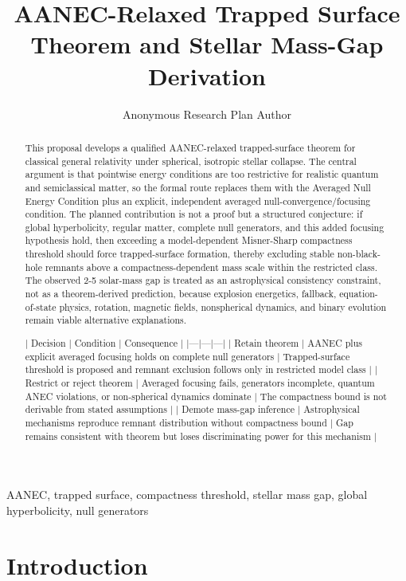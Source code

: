 \documentclass[conference]{IEEEtran}
\begin{document}
\title{AANEC-Relaxed Trapped Surface Theorem and Stellar Mass-Gap Derivation}\author{Anonymous Research Plan Author}\maketitle

\begin{abstract}
This proposal develops a qualified AANEC-relaxed trapped-surface theorem for classical general relativity under spherical, isotropic stellar collapse. The central argument is that pointwise energy conditions are too restrictive for realistic quantum and semiclassical matter, so the formal route replaces them with the Averaged Null Energy Condition plus an explicit, independent averaged null-convergence/focusing condition. The planned contribution is not a proof but a structured conjecture: if global hyperbolicity, regular matter, complete null generators, and this added focusing hypothesis hold, then exceeding a model-dependent Misner-Sharp compactness threshold should force trapped-surface formation, thereby excluding stable non-black-hole remnants above a compactness-dependent mass scale within the restricted class. The observed 2-5 solar-mass gap is treated as an astrophysical consistency constraint, not as a theorem-derived prediction, because explosion energetics, fallback, equation-of-state physics, rotation, magnetic fields, nonspherical dynamics, and binary evolution remain viable alternative explanations.

| Decision | Condition | Consequence | |---|---|---| | Retain theorem | AANEC plus explicit averaged focusing holds on complete null generators | Trapped-surface threshold is proposed and remnant exclusion follows only in restricted model class | | Restrict or reject theorem | Averaged focusing fails, generators incomplete, quantum ANEC violations, or non-spherical dynamics dominate | The compactness bound is not derivable from stated assumptions | | Demote mass-gap inference | Astrophysical mechanisms reproduce remnant distribution without compactness bound | Gap remains consistent with theorem but loses discriminating power for this mechanism |
\end{abstract}
\begin{IEEEkeywords}
AANEC, trapped surface, compactness threshold, stellar mass gap, global hyperbolicity, null generators
\end{IEEEkeywords}\section{Introduction}
\end{document}
